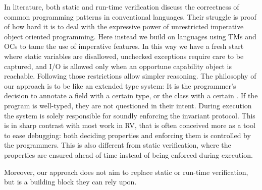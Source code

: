 
\loseSpace
In literature, both static and run-time verification discuss
the correctness of common programming patterns in conventional languages.
Their struggle is proof of how hard it is to deal with the expressive power of unrestricted imperative object oriented programming.
 Here instead we build on languages using TMs and OCs to tame the use of imperative features. In this way
we have a fresh start where static variables are disallowed, unchecked exceptions require care to be captured, and I/O is allowed only when an opportune capability object is reachable.
Following those restrictions allow simpler reasoning.
The philosophy of our approach is to be like an extended type system: 
It is the programmer's decision
to annotate a field with a certain type,
or the class with a certain \validate.
If the program is well-typed, they are not questioned in their intent.
During execution the system is solely responsible for soundly enforcing the invariant protocol.
This is in sharp contrast with most work in RV, that is often conceived more as a tool to ease debugging:
both deciding properties and enforcing them is controlled by the programmers.
This is also different from static verification,
where the properties are ensured ahead of time instead of being enforced during execution.


Moreover, our approach does not aim to replace static or run-time verification,
but is a building block they can rely upon.


